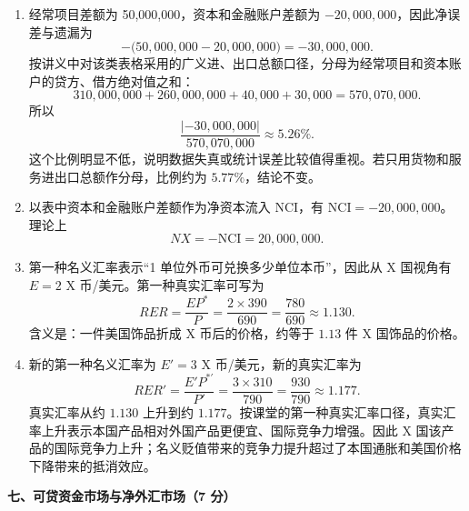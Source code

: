 \begin{question}
\begin{solution}
\begin{enumerate}[label=(\alph*),leftmargin=2.5em]
  \item 经常项目差额为 50,000,000，资本和金融账户差额为 $-20,000,000$，因此净误差与遗漏为
  \[
  -\bigl(50,000,000-20,000,000\bigr)=-30,000,000.
  \]
  按讲义中对该类表格采用的广义进、出口总额口径，分母为经常项目和资本账户的贷方、借方绝对值之和：
  \[
  310,000,000+260,000,000+40,000+30,000=570,070,000.
  \]
  所以
  \[
  \frac{|{-30,000,000}|}{570,070,000}\approx 5.26\%.
  \]
  这个比例明显不低，说明数据失真或统计误差比较值得重视。若只用货物和服务进出口总额作分母，比例约为 $5.77\%$，结论不变。
  \item 以表中资本和金融账户差额作为净资本流入 NCI，有 $\text{NCI}=-20,000,000$。理论上
  \[
  NX=-\text{NCI}=20,000,000.
  \]
  \item 第一种名义汇率表示“1 单位外币可兑换多少单位本币”，因此从 X 国视角有 $E=2$ X 币/美元。第一种真实汇率可写为
  \[
  RER=\frac{E P^*}{P}=\frac{2\times 390}{690}=\frac{780}{690}\approx 1.130.
  \]
  含义是：一件美国饰品折成 X 币后的价格，约等于 $1.13$ 件 X 国饰品的价格。
  \item 新的第一种名义汇率为 $E'=3$ X 币/美元，新的真实汇率为
  \[
  RER'=\frac{E'P^{*'}}{P'}=\frac{3\times 310}{790}=\frac{930}{790}\approx 1.177.
  \]
  真实汇率从约 $1.130$ 上升到约 $1.177$。按课堂的第一种真实汇率口径，真实汇率上升表示本国产品相对外国产品更便宜、国际竞争力增强。因此 X 国该产品的国际竞争力上升；名义贬值带来的竞争力提升超过了本国通胀和美国价格下降带来的抵消效应。
\end{enumerate}
\end{solution}
\end{question}

\textbf{七、可贷资金市场与净外汇市场（7 分）}

